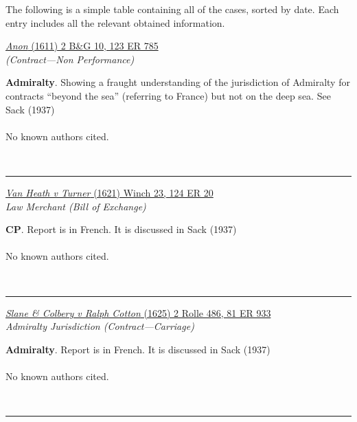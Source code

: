 \documentclass[twoside]{article}
\begin{document}
The following is a simple table containing all of the cases, sorted by date. Each entry includes all the relevant obtained information.
\\ 


        \begin{small}
        \begin{center}
        \href{https://heinonline.org/HOL/P?h=hein.engrep/engrg0123&i=789}{\textit{Anon} (1611) 2 B\&G 10, 123 ER 785} \label{5} \\ 
\textit{ (Contract---Non Performance)}\\
        \end{center}
        \textbf{Admiralty}. Showing a fraught understanding of the jurisdiction of Admiralty for contracts “beyond the sea” (referring to France) but not on the deep sea. See Sack (1937)\\\\No known authors cited.
        \end{small}\\
        \rule{\textwidth}{0.5pt}
        

        \begin{small}
        \begin{center}
        \href{https://heinonline.org/HOL/P?h=hein.engrep/engrg0124&i=24}{\textit{Van Heath v Turner} (1621) Winch 23, 124 ER 20} \label{3} \\ 
\textit{Law Merchant (Bill of Exchange)}\\
        \end{center}
        \textbf{CP}. Report is in French. It is discussed in Sack (1937)\\\\No known authors cited.
        \end{small}\\
        \rule{\textwidth}{0.5pt}
        

        \begin{small}
        \begin{center}
        \href{https://heinonline.org/HOL/P?h=hein.engrep/engrf0081&i=937}{\textit{Slane \& Colbery v Ralph Cotton} (1625) 2 Rolle 486, 81 ER 933} \label{6} \\ 
\textit{Admiralty Jurisdiction (Contract---Carriage)}\\
        \end{center}
        \textbf{Admiralty}. Report is in French. It is discussed in Sack (1937)\\\\No known authors cited.
        \end{small}\\
        \rule{\textwidth}{0.5pt}
        
\end{document}
